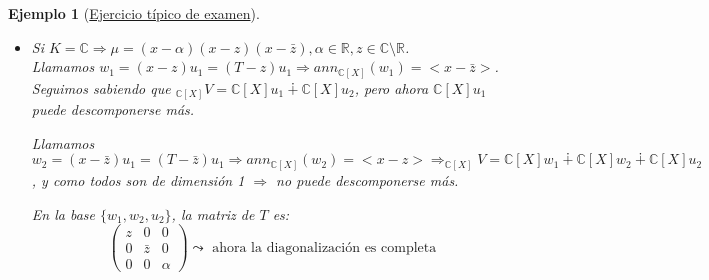 \documentclass[11pt,a4paper]{article}
\theoremstyle{break}
\newtheorem{example}[theorem]{Ejemplo}
\begin{document}
\begin{example}[\underline{Ejercicio típico de examen}]
\begin{itemize}
Tenemos $_{\mathbb{R}[X]}V = \mathbb{R}[X]v_{3}$. Definimos $u_{1} = (x-\alpha)v_{3} = (T-\alpha)v_{3} \Rightarrow ann_{\mathbb{R}[x]}(u_{1}) = <x^{2} - 2Re(z)x + |z|^{2}>$. Definiendo $u_{2} = (x^{2} - 2Re(z)x + |z|^{2})v_{3} = (T^{2} + 2Re(z)T + |z|^{2})v^{3}$, tenemos $ann_{\mathbb{R}[X]}(u_{2}) = <x-\alpha>$.


En consecuencia, $_{\mathbb{R}[X]}V = \underset{\text{simple}}{\underline{\mathbb{R}[X]u_{1}}} \dotplus \underset{\text{simple}}{\underline{\mathbb{R}[X]u_{2}}} \Rightarrow _{\mathbb{R}[X]}V$ es un módulo semisimple de longitud 2. \\
Tomamos en $V$ la $\mathbb{R}-$base dada por $\{\mu, Tu_{1}, u_{2}\}$. La matriz de $T$ (por filas) respecto a dicha base es:
$$\begin{pmatrix}
0 & 1 & 0 \\
-|z|^{2} & 2 Re(z) & 0 \\
0 & 0 & \alpha
\end{pmatrix} \leadsto \text{ diagonlaización por bloques}$$
$T^{2}u_{1} = (2 Re(z)T - |z|^{2})u_{1}, Tu_{2} = \alpha u_{2}$.
\item Si $K = \mathbb{C} \Rightarrow \mu = (x - \alpha)(x - z)(x - \bar{z}), \alpha \in \mathbb{R}, z \in \mathbb{C} \setminus \mathbb{R}$. \\
Llamamos $w_{1} = (x-z)u_{1} = (T-z)u_{1} \Rightarrow ann_{\mathbb{C}[X]}(w_{1}) = <x-\bar{z}>$. \\
Seguimos sabiendo que $_{\mathbb{C}[X]}V = \mathbb{C}[X]u_{1} \dotplus \mathbb{C}[X]u_{2}$, pero ahora $\mathbb{C}[X]u_{1}$ puede descomponerse más.

Llamamos $w_{2} = (x-\bar{z})u_{1} = (T-\bar{z})u_{1} \Rightarrow ann_{\mathbb{C}[X]}(w_{2}) = <x-z> \Rightarrow_{\mathbb{C}[X]}V = \mathbb{C}[X]w_{1} \dotplus \mathbb{C}[X]w_{2} \dotplus \mathbb{C}[X]u_{2}$, y como todos son de dimensión 1 $\Rightarrow$ no puede descomponerse más.

En la base $\{w_{1}, w_{2}, u_{2}\}$, la matriz de $T$ es:
$$\begin{pmatrix}
z & 0 & 0 \\
0 & \bar{z} & 0 \\
0 & 0 & \alpha
\end{pmatrix} \leadsto \text{ ahora la diagonalización es completa}$$
\end{itemize}


\end{example}
\end{document}
